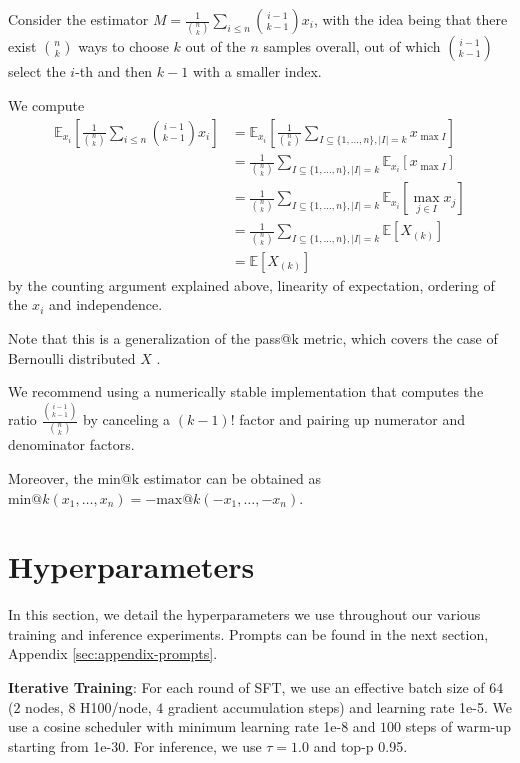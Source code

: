 Consider the estimator $
M = \frac{1}{\binom{n}{k}}\sum_{i \leq n} \binom{i-1}{k-1} x_i$,
with the idea being that there exist $\binom{n}{k}$ ways to choose $k$ out of the $n$ samples overall, out of which $\binom{i-1}{k-1}$ select the $i$-th and then $k-1$ with a smaller index.

We compute
\begin{align*}
\mathbb{E}_{x_i}\left[\frac{1}{\binom{n}{k}}\sum_{i \leq n} \binom{i-1}{k-1} x_i\right]
&= \mathbb{E}_{x_i}\left[ \frac{1}{\binom{n}{k}} \sum_{I \subseteq \{1, \ldots, n\}, |I| = k} x_{\max I} \right]  \\
&= \frac{1}{\binom{n}{k}} \sum_{I \subseteq \{1, \ldots, n\}, |I| = k} \mathbb{E}_{x_i}\left[ x_{\max I} \right]  \\
&= \frac{1}{\binom{n}{k}} \sum_{I \subseteq \{1, \ldots, n\}, |I| = k} \mathbb{E}_{x_i}\left[ \max_{j \in I} x_j \right] \\
&= \frac{1}{\binom{n}{k}} \sum_{I \subseteq \{1, \ldots, n\}, |I| = k} \mathbb{E} \left[ X_{(k)} \right] \\
&= \mathbb{E}\left[ X_{(k)} \right] 
\end{align*}
by the counting argument explained above, linearity of expectation, ordering of the $x_i$ and independence. 

Note that this is a generalization of the pass@k metric, which covers the case of Bernoulli distributed  $X$ \citep{chen2021evaluatinglargelanguagemodels}.

We recommend using a numerically stable implementation that computes the ratio $\frac{\binom{i-1}{k-1}}{\binom{n}{k}}$ by canceling a $(k-1)!$ factor and pairing up numerator and denominator factors.

Moreover, the min@k estimator can be obtained as $\text{min@}k(x_1, \ldots, x_n) = -\text{max@}k(-x_1, \ldots, -x_n)$.
\vfill


\newpage
\section{Hyperparameters}

In this section, we detail the hyperparameters we use throughout our various training and inference experiments. Prompts can be found in the next section, Appendix \ref{sec:appendix-prompts}.

\textbf{Iterative Training}: For each round of SFT, we use an effective batch size of $64$ ($2$ nodes, $8$ H100/node, $4$ gradient accumulation steps) and learning rate 1e-5. We use a cosine scheduler with minimum learning rate 1e-8 and $100$ steps of warm-up starting from 1e-30. For inference, we use $\tau=1.0$ and top-p 0.95.

